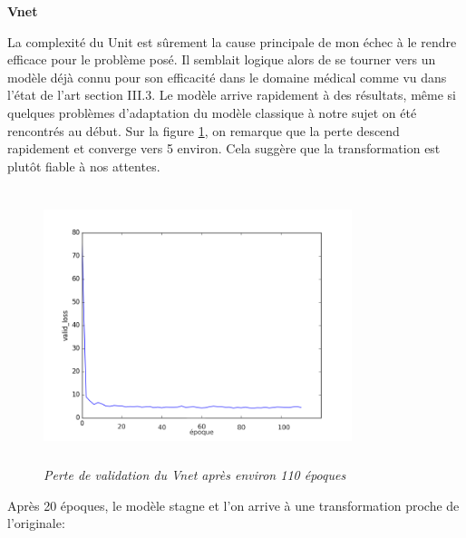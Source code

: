 \documentclass[12pt, oneside, a4paper, titlepage]{article}
\begin{document}
\textbf{Vnet}\\

\vspace{1mm}

La complexité du Unit \cite{liu_unsupervised_2018} est sûrement la cause principale de mon échec à le rendre efficace pour le problème posé. Il semblait logique alors de se tourner vers un modèle déjà connu pour son efficacité dans le domaine médical comme vu dans l'état de l'art section III.3. Le modèle arrive rapidement à des résultats, même si quelques problèmes d'adaptation du modèle classique à notre sujet on été rencontrés au début.
Sur la figure \ref{fig:perte_vnet}, on remarque que la perte descend rapidement et converge vers 5 environ. Cela suggère que la transformation est plutôt fiable à nos attentes.

\vspace{5mm}
\begin{figure}[H]
    \centering
    \includegraphics[width=9cm, height=8cm]{valid_loss_vnet.png}
    \caption{\textit{Perte de validation du Vnet après environ 110 époques }}
    \label{fig:perte_vnet}
\end{figure}

\vspace{5mm}

Après 20 époques, le modèle stagne et l'on arrive à une transformation proche de l'originale:


\vspace{5mm}
\end{document}
